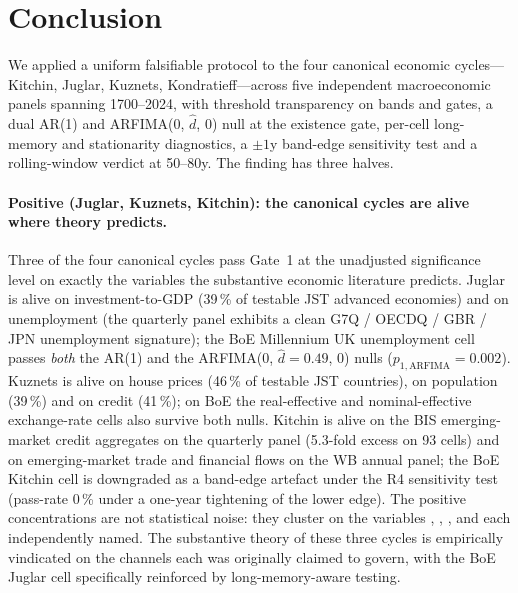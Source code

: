 \section{Conclusion}
\label{sec:conclusion}

We applied a uniform falsifiable protocol to the four canonical
economic cycles---Kitchin, Juglar, Kuznets, Kondratieff---across
five independent macroeconomic panels spanning 1700--2024, with
threshold transparency on bands and gates, a dual AR(1) and
ARFIMA(0, \(\hat d\), 0) null at the existence gate,
per-cell long-memory and stationarity diagnostics, a
\(\pm 1\)y band-edge sensitivity test and a rolling-window
verdict at 50--80y. The finding has three halves.

\paragraph{Positive (Juglar, Kuznets, Kitchin): the canonical
cycles are alive where theory predicts.}
Three of the four canonical cycles pass Gate~1 at the
unadjusted significance level on exactly the variables the
substantive economic literature predicts. Juglar is alive on
investment-to-GDP (39\,\% of testable JST advanced economies)
and on unemployment (the quarterly panel exhibits a clean
G7Q / OECDQ / GBR / JPN unemployment signature); the BoE
Millennium UK unemployment cell passes \emph{both} the AR(1)
and the ARFIMA(0, \(\hat d=0.49\), 0) nulls
(\(p_{1,\mathrm{ARFIMA}}=0.002\)). Kuznets is alive on
house prices (46\,\% of testable JST countries), on
population (39\,\%) and on credit (41\,\%); on BoE the
real-effective and nominal-effective exchange-rate cells
also survive both nulls. Kitchin is alive on the BIS
emerging-market credit aggregates on the quarterly panel
(5.3-fold excess on 93 cells) and on emerging-market trade
and financial flows on the WB annual panel; the BoE Kitchin
cell is downgraded as a band-edge artefact under the R4
sensitivity test (pass-rate 0\,\% under a one-year tightening
of the lower edge). The positive concentrations are not
statistical noise: they cluster on the variables
\citet{kitchin1923}, \citet{juglar1862}, \citet{kuznets1930},
\citet{schumpeter1939} and \citet{borio2014} each
independently named. The substantive theory of these three
cycles is empirically vindicated on the channels each was
originally claimed to govern, with the BoE Juglar cell
specifically reinforced by long-memory-aware testing.

